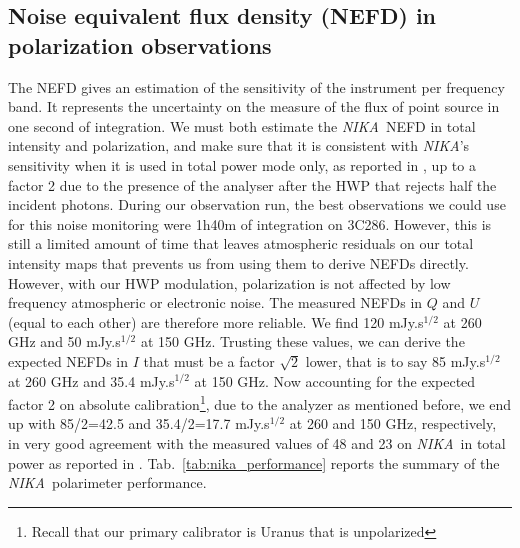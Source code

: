 \documentclass[twocolumn, traditabstract]{aa}
\newcommand{\nika}{{\it NIKA}}
\begin{document}
\subsection{Noise equivalent flux density (NEFD) in polarization observations}
The NEFD gives an estimation of the sensitivity of the instrument per frequency
band. It represents the uncertainty on the measure of the flux of point source
in one second of integration. We must both estimate the \nika\ NEFD in total
intensity and polarization, and make sure that it is consistent with \nika's
sensitivity when it is used in total power mode only, as reported in
\citet{catalano2014}, up to a factor 2 due to the presence of the analyser after
the HWP that rejects half the incident photons. During our observation run, the
best observations we could use for this noise monitoring were 1h40m of
integration on 3C286. However, this is still a limited amount of time that
leaves atmospheric residuals on our total intensity maps that prevents us from
using them to derive NEFDs directly. However, with our HWP modulation,
polarization is not affected by low frequency atmospheric or electronic
noise. The measured NEFDs in $Q$ and $U$ (equal to each other) are therefore
more reliable. We find 120 mJy.s$^{1/2}$ at 260 GHz and 50 mJy.s$^{1/2}$ at 150
GHz. Trusting these values, we can derive the expected NEFDs in $I$ that must be
a factor $\sqrt{2}$ lower, that is to say 85 mJy.s$^{1/2}$ at 260 GHz and 35.4
mJy.s$^{1/2}$ at 150 GHz. Now accounting for the expected factor 2 on absolute
calibration\footnote{Recall that our primary calibrator is Uranus that is
  unpolarized}, due to the analyzer as mentioned before, we end up with
85/2=42.5 and 35.4/2=17.7 mJy.s$^{1/2}$ at 260 and 150 GHz, respectively, in
very good agreement with the measured values of 48 and 23 on \nika\ in total
power as reported in \cite{catalano2014}.
\noindent
Tab.~\ref{tab:nika_performance} reports the summary of the \nika\ polarimeter performance. 
\end{document}
